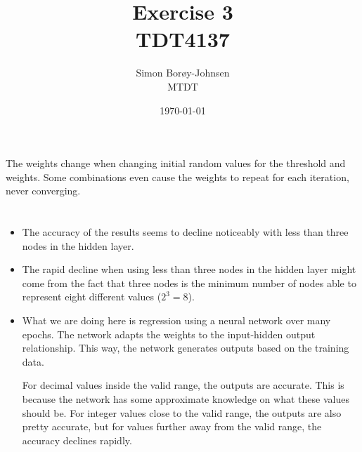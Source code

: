 \documentclass{article}
\begin{document}
\title{\textbf{Exercise 3} \\ TDT4137}
\author{Simon Borøy-Johnsen \\ MTDT}
\date{\today}
\maketitle


\section{}
The weights change when changing initial random values for the threshold and weights. Some combinations even cause the weights to repeat for each iteration, never converging.

\section{}
\begin{itemize}
    \item The accuracy of the results seems to decline noticeably with less than three nodes in the hidden layer.
    \item The rapid decline when using less than three nodes in the hidden layer might come from the fact that three nodes is the minimum number of nodes able to represent eight different values ($2^3 = 8$).
    \item What we are doing here is regression using a neural network over many epochs. The network adapts the weights to the input-hidden output relationship. This way, the network generates outputs based on the training data.
    
    For decimal values inside the valid range, the outputs are accurate. This is because the network has some approximate knowledge on what these values should be. For integer values close to the valid range, the outputs are also pretty accurate, but for values further away from the valid range, the accuracy declines rapidly.
\end{itemize}
\end{document}

